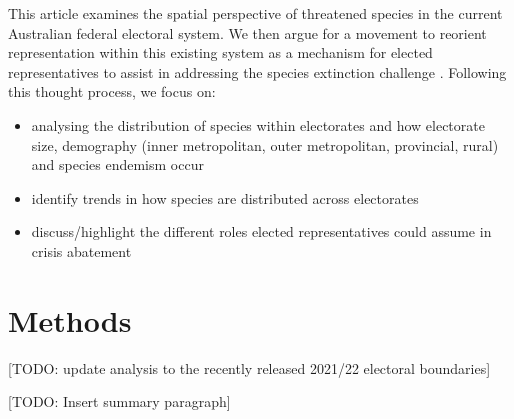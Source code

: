 \documentclass[a4paper,11pt]{article}
\begin{document}

This article examines the spatial perspective of threatened species in the current Australian federal electoral system. We then argue for a movement to reorient representation within this existing system as a mechanism for elected representatives to assist in addressing the species extinction challenge \cite{burkeSpeciesBordersPolitical2020}. 
Following this thought process, we focus on:
\begin{itemize}
    \item analysing the distribution of species within electorates and how electorate size, demography (inner metropolitan, outer metropolitan, provincial, rural) and species endemism occur
    \item identify trends in how species are distributed across electorates
    \item discuss/highlight the different roles elected representatives could assume in crisis abatement
\end{itemize}

\section{Methods}
[TODO: update analysis to the recently released 2021/22 electoral boundaries]

[TODO: Insert summary paragraph]
\end{document}

